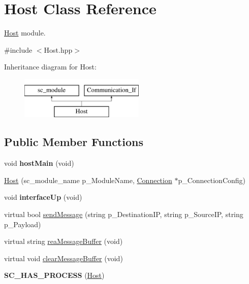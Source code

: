 \hypertarget{classHost}{\section{Host Class Reference}
\label{classHost}
}


\hyperlink{classHost}{Host} module.  




{\ttfamily \#include $<$Host.\-hpp$>$}

Inheritance diagram for Host\-:\begin{figure}[H]
\begin{center}
\leavevmode
\includegraphics[height=2.000000cm]{classHost}
\end{center}
\end{figure}
\subsection*{Public Member Functions}
\begin{DoxyCompactItemize}
\item 
\hypertarget{classHost_a2b50e87ea08877ce1f618f0305cfcc30}{void {\bfseries host\-Main} (void)}\label{classHost_a2b50e87ea08877ce1f618f0305cfcc30}

\item 
\hyperlink{classHost_a8c8159669a97b7d2e7aeca227c1c0e97}{Host} (sc\-\_\-module\-\_\-name p\-\_\-\-Module\-Name, \hyperlink{classConnection}{Connection} $\ast$p\-\_\-\-Connection\-Config)
\item 
\hypertarget{classHost_abbb2fd8a913de123b33160c140d54c71}{void {\bfseries interface\-Up} (void)}\label{classHost_abbb2fd8a913de123b33160c140d54c71}

\item 
virtual bool \hyperlink{classHost_a56eb630fcf00ef1184d5df27f66a9b9e}{send\-Message} (string p\-\_\-\-Destination\-I\-P, string p\-\_\-\-Source\-I\-P, string p\-\_\-\-Payload)
\item 
virtual string \hyperlink{classHost_a4393bc6a6521e084d9f2663f8d0564bb}{rea\-Message\-Buffer} (void)
\item 
virtual void \hyperlink{classHost_aa70d91a0fd3b482f001909569b3396be}{clear\-Message\-Buffer} (void)
\item 
\hypertarget{classHost_adc2e7e8bd896b96767b11c3f3da61ec6}{{\bfseries S\-C\-\_\-\-H\-A\-S\-\_\-\-P\-R\-O\-C\-E\-S\-S} (\hyperlink{classHost}{Host})}\label{classHost_adc2e7e8bd896b96767b11c3f3da61ec6}

\end{DoxyCompactItemize}
